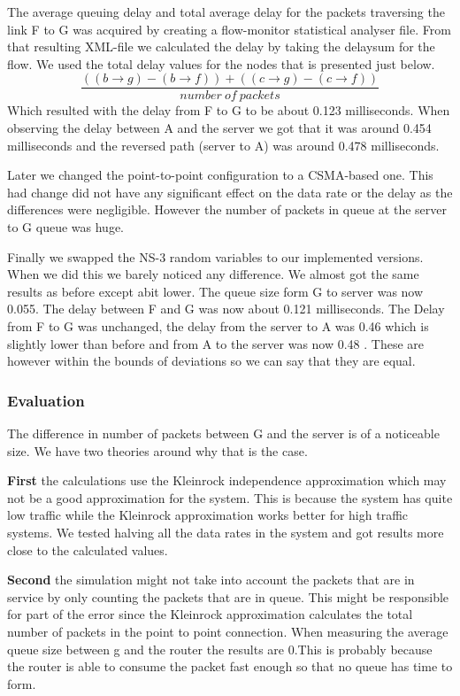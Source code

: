 \documentclass{article}
\begin{document}
The average queuing delay and total average delay for the packets traversing the link F to G 
was acquired by creating a flow-monitor statistical analyser file. From that resulting XML-file 
we calculated the delay by taking the delaysum for the flow. We used the total delay values for 
the nodes that is presented just below.
$$\frac{((b \rightarrow g) - (b \rightarrow f)) + ((c \rightarrow g) - (c \rightarrow f))}{number\ of\ packets}$$
Which resulted with the delay from F to G to be about 0.123 milliseconds.  
When observing the delay between A and the server we got that it was around 0.454 milliseconds 
and the reversed path (server to A) was around 0.478 milliseconds. 

Later we changed the point-to-point configuration to a CSMA-based one. This had change did not 
have any significant effect on the data rate or the delay as the differences were negligible.
However the number of packets in queue at the server to G queue was huge.

Finally we swapped the NS-3 random variables to our implemented versions. When we did this we
barely noticed any difference. We almost got the same results as before except abit lower.
The queue size form G to server was now 0.055.
The delay between F and G was now about 0.121 milliseconds.
The Delay from F to G was unchanged, the delay from the server to A was 0.46 which is slightly 
lower than before and from A to the server was now 0.48 . These are however within the bounds 
of deviations so we can say that they are equal.


\subsubsection{Evaluation}
The difference in number of packets between G and the server is of a noticeable size. We have 
two theories around why that is the case.

\textbf{First} the calculations use the Kleinrock independence approximation which may not be 
a good approximation for the system. This is because the system has quite low traffic while the 
Kleinrock approximation works better for high traffic systems. We tested halving all the data 
rates in the system and got results more close to the calculated values.

\textbf{Second} the simulation might not take into account the packets that are in service 
by only counting the packets that are in queue. This might be responsible for part of the 
error since the Kleinrock approximation calculates the total number of packets in the point 
to point connection. When measuring the average queue size between g and the router the 
results are 0.This is probably because the router is able to consume the packet fast enough 
so that no queue has time to form.
\end{document}
